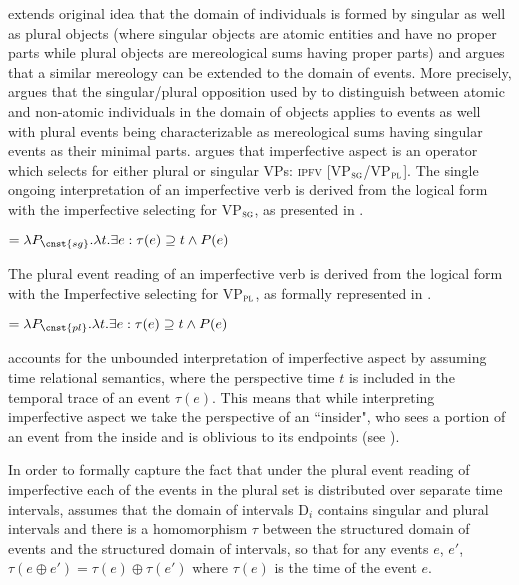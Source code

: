 \documentclass[output=paper]{langscibook}
\begin{document}
\citet{Ferreira2004, Ferreira2005} extends  original idea that the domain of individuals is formed by singular as well as plural objects (where singular objects are atomic entities and have no proper parts while plural objects are mereological sums having proper parts) and argues that a similar mereology can be extended to the domain of events. More precisely, \citet{Ferreira2004, Ferreira2005} argues that the singular/plural opposition used by \citet{Link1983} to distinguish between atomic and non-atomic individuals in the domain of objects applies to events as well with plural events being characterizable as mereological sums having singular events as their minimal parts. \citet{Ferreira2004, Ferreira2005} argues that imperfective aspect is an operator which selects for either plural or singular VPs: \textsc{ipfv} [VP$_\textsc{sg}$/VP$_\textsc{pl}$]. The single ongoing interpretation of an imperfective verb is derived from the logical form with the imperfective selecting for VP$_\textsc{sg}$, as presented in .

\ea {} $= \lambda P_\cnst{sg}. \lambda t. \exists e : \tau(e) \supseteq t \wedge P(e)$\label{jan-bla:fansb:kb:ex11}
\z 

\noindent The plural event reading of an imperfective verb is derived from the logical form with the Imperfective selecting for VP$_\textsc{pl}$, as formally represented in .

\ea {} $= \lambda P_\cnst{pl}. \lambda t. \exists e : \tau(e) \supseteq t \wedge P(e)$\label{jan-bla:fansb:kb:ex12}
\z 

\noindent \citet{Ferreira2004, Ferreira2005} accounts for the unbounded interpretation of imperfective aspect by assuming  time relational semantics, where the perspective time $t$ is included in the temporal trace of an event $\tau(e)$. This means that while interpreting imperfective aspect we take the perspective of an ``insider", who sees a portion of an event from the inside and is oblivious to its endpoints (see \citealt{KazaninaandPhillips2003}). 

In order to formally capture the fact that under the plural event reading of imperfective each of the events in the plural set is distributed over separate time intervals, \citet{Ferreira2004, Ferreira2005} assumes that the domain of intervals D$_i$ contains singular and plural intervals and there is a homomorphism $\tau$ between the structured domain of events and the structured domain of intervals, so that for any events $e$, $e'$, $\tau (e\oplus e') = \tau(e)\oplus \tau(e')$ where $\tau(e)$ is the time of the event $e$. 
\end{document}
